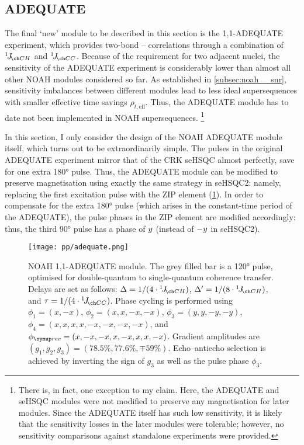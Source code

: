 \subsection{ADEQUATE}
\label{subsec:noah__adequate}

The final `new' module to be described in this section is the 1,1-ADEQUATE experiment\autocite{Reif1996JMRSA}, which provides two-bond -- correlations through a combination of $\oneJ{CH}$ and $\oneJ{CC}$.
Because of the requirement for two adjacent \carbon{} nuclei, the sensitivity of the ADEQUATE experiment is considerably lower than almost all other NOAH modules considered so far.
As established in \cref{subsec:noah__snr}, sensitivity imbalances between different modules lead to less ideal supersequences with smaller effective time savings $\rho_{t,\text{eff}}$.
Thus, the ADEQUATE module has to date not been implemented in NOAH supersequences.%
\footnote{There is, in fact, one exception to my claim\autocite{RaoKakita2020RSCA}. Here, the ADEQUATE and seHSQC modules were not modified to preserve any magnetisation for later modules. Since the ADEQUATE itself has such low sensitivity, it is likely that the sensitivity losses in the later modules were tolerable; however, no sensitivity comparisons against standalone experiments were provided.}

In this section, I only consider the design of the NOAH ADEQUATE module itself, which turns out to be extraordinarily simple.
The \proton{} pulses in the original ADEQUATE experiment mirror that of the CRK seHSQC almost perfectly, save for one extra \ang{180} pulse.
Thus, the ADEQUATE module can be modified to preserve  magnetisation using exactly the same strategy in seHSQC2: namely, replacing the first \proton{} excitation pulse with the ZIP element (\cref{fig:adequate_noah}).
In order to compensate for the extra \ang{180} pulse (which arises in the constant-time period of the ADEQUATE), the pulse phases in the ZIP element are modified accordingly: thus, the third \proton{} \ang{90} pulse has a phase of $y\/$ (instead of $-y\/$ in seHSQC2).

\begin{figure}[htb]
    \centering
    \texttt{[image: pp/adequate.png]}%
    \caption[NOAH 1,1-ADEQUATE module]{
        NOAH 1,1-ADEQUATE module.
        The grey filled bar is a \ang{120} pulse, optimised for \carbon{} double-quantum to single-quantum coherence transfer\autocite{Mareci1982JMR}.
        Delays are set as follows: $\Delta = 1 / (4 \cdot \oneJ{CH})$, $\Delta' = 1 / (8 \cdot \oneJ{CH})$, and $\tau = 1 / (4 \cdot \oneJ{CC})$.
        Phase cycling is performed using $\phi_1 = (x, -x)$, $\phi_2 = (x, x, -x, -x)$, $\phi_3 = (y, y, -y, -y)$, $\phi_4 = (x, x, x, x, -x, -x, -x, -x)$, and $\phirec = (x, -x, -x, x, -x, x, x, -x)$.
        Gradient amplitudes are $(g_1, g_2, g_3) = (78.5\%, 77.6\%, \mp 59\%)$.
        Echo--antiecho selection is achieved by inverting the sign of $g_3$ as well as the pulse phase $\phi_3$.
    }
    \label{fig:adequate_noah}
\end{figure}

